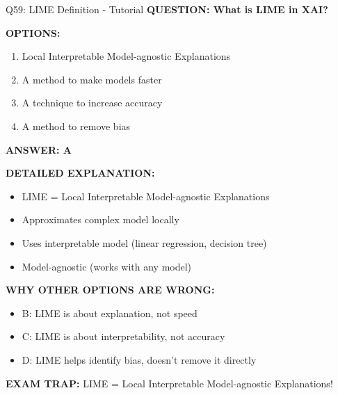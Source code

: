 \documentclass[8pt]{beamer}
\begin{document}
	\begin{frame}{Q59: LIME Definition - Tutorial}
		\fontsize{6.5}{7.5}\selectfont
		\textbf{QUESTION: What is LIME in XAI?}
		
		\vspace{0.1cm}
		\textbf{OPTIONS:}
		\begin{enumerate}
			\item Local Interpretable Model-agnostic Explanations
			\item A method to make models faster
			\item A technique to increase accuracy
			\item A method to remove bias
		\end{enumerate}
		
		\vspace{0.1cm}
		\textcolor{myblue}{\textbf{ANSWER: A}}
		
		\vspace{0.1cm}
		\textbf{DETAILED EXPLANATION:}
		\begin{itemize}
			\item LIME = Local Interpretable Model-agnostic Explanations
			\item Approximates complex model locally
			\item Uses interpretable model (linear regression, decision tree)
			\item Model-agnostic (works with any model)
		\end{itemize}
		
		\vspace{0.1cm}
		\textcolor{myred}{\textbf{WHY OTHER OPTIONS ARE WRONG:}}
		\begin{itemize}
			\item \textcolor{myred}{B:} LIME is about explanation, not speed
			\item \textcolor{myred}{C:} LIME is about interpretability, not accuracy
			\item \textcolor{myred}{D:} LIME helps identify bias, doesn't remove it directly
		\end{itemize}
		
		\textcolor{myred}{\textbf{EXAM TRAP:}} LIME = \textcolor{myblue}{Local Interpretable Model-agnostic Explanations}!
	\end{frame}
	
\end{document}
